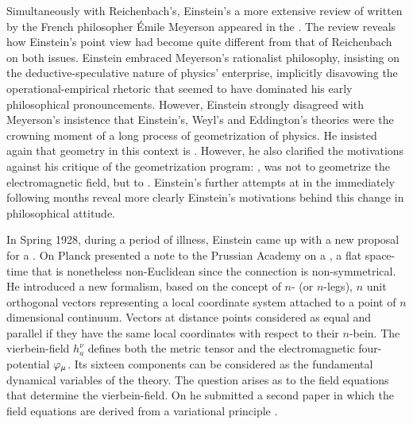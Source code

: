 \documentclass[draft]{article}
\renewcommand{\me}{;~m.e.{}}
\newcommand{\nbein}{$n$-bein\xspace}
\newcommand{\vbein}{vierbein\xspace}
\newcommand{\hbein}{\ensuremath{h_{a}^{\nu}}\xspace}
\begin{document}
Simultaneously with Reichenbach's, Einstein's a more extensive review of  written by the French philosopher \'Emile Meyerson \citep{Meyerson1925} appeared in the \citet{Einstein1928b}. The review reveals how Einstein's point view had become quite different from that of Reichenbach on both issues. Einstein embraced Meyerson's rationalist philosophy, insisting on the deductive-speculative nature of physics' enterprise, implicitly disavowing the operational-empirical rhetoric that seemed to have dominated his early philosophical pronouncements. However, Einstein strongly disagreed with Meyerson's insistence that Einstein's, Weyl's and Eddington's theories were the crowning moment of a long process of geometrization of physics. He insisted again that geometry in this context is  \citep[165\me]{Einstein1928b}. However, he also clarified the motivations against his critique of the geometrization program: , was not to geometrize the electromagnetic field, but to  \citep[165\me]{Einstein1928b}. Einstein's further attempts at \uft in the immediately following months reveal more clearly Einstein's motivations behind this change in philosophical attitude.


In Spring 1928, during a period of illness, Einstein came up with a new proposal for a \uft. On  Planck presented a note to the Prussian Academy on a  \citep{Einstein19281}, a flat space-time that is nonetheless non-Euclidean since the connection \Gtmn is non-symmetrical. He introduced a new formalism, based on the concept of $n$- (or $n$-legs), $n$ unit orthogonal vectors representing a local coordinate system attached to a point of $n$ dimensional continuum. Vectors at distance points considered as equal and parallel if they have the same local coordinates with respect to their \nbein. The \vbein-field \hbein defines both the metric tensor \gmn and the electromagnetic four-potential $\varphi_{\mu}$. Its sixteen components can be considered as the fundamental dynamical variables of the theory. The question arises as to the field equations that determine the \vbein-field. On  he submitted a second paper in which the field equations are derived from a variational principle \citep{Einstein19282}.
\end{document}
